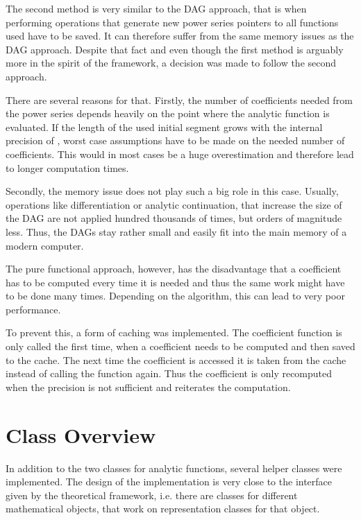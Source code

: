 		The second method is very similar to the DAG approach, that is when
    performing operations that generate new power series pointers to all
    functions used have to be saved. 
    It can therefore suffer from the same memory issues as the DAG approach.
		Despite that fact and even though the first method is arguably more in the spirit of the \irram framework, a decision was made to follow the second approach.

		There are several reasons for that. 
    Firstly, the number of coefficients needed from the power series depends heavily on the point where the analytic function is evaluated. 
		If the length of the used initial segment grows with the internal precision of \irram, worst case assumptions have to be 
		made on the needed number of coefficients. 
		This would in most cases be a huge overestimation and therefore lead to longer computation times.

		Secondly, the memory issue does not play such a big role in this case. 
		Usually, operations like differentiation or analytic continuation, that increase the size of the DAG 
		are not applied hundred thousands of times, but orders of magnitude less. 
		Thus, the DAGs stay rather small and easily fit into the main memory of a modern computer.

		The pure functional approach, however, has the disadvantage that a coefficient has to
		be computed every time it is needed and thus the same work might have to be done many times. 
		Depending on the algorithm, this can lead to very poor performance.

		To prevent this, a form of caching was implemented. The coefficient function is only called the first time, when a 
		coefficient needs to be computed and then saved to the cache. The next time the coefficient is accessed it is taken from 
		the cache instead of calling the function again. 
    Thus the coefficient is only recomputed when the precision is not sufficient and \irram reiterates the computation.



	\section{Class Overview}
		In addition to the two classes for analytic functions, several helper classes were implemented.
    The design of the implementation is very close to the interface given by the theoretical framework, i.e.
    there are classes for different mathematical objects, that work on representation classes for that object.

